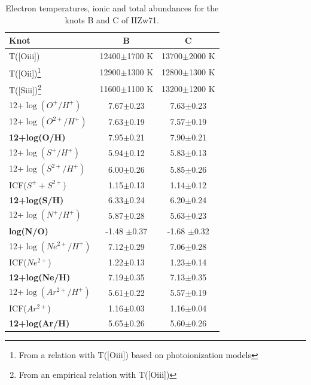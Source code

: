\documentclass[structabstract]{aa}
\begin{document}
\begin{table}
\begin{minipage}{85mm}
{\small
\caption{Electron temperatures, ionic and total abundances for
the knots B and C of IIZw71.} 
\begin{center}
\begin{tabular}{l cc }
\hline
\hline
Knot & B & C \\
                          
\hline                                    
T([O{\sc iii}])&  12400$\pm$1700 K & 13700$\pm$2000 K     \\ 
T([O{\sc ii}])\footnote{From a relation with T([O{\sc iii}]) based on photoionization models} &  12900$\pm$1300 K & 12800$\pm$1300 K       \\ 
T([S{\sc iii}])\footnote{From an empirical relation with T([O{\sc iii}])} &  11600$\pm$1100 K & 13200$\pm$1200 K     \\ 
\hline
12+$\log(O^+/H^+)$    &7.67$\pm$0.23 & 7.63$\pm$0.23   \\
12+$\log(O^{2+}/H^+)$ & 7.63$\pm$0.19 & 7.57$\pm$0.19  \\
\bf{ 12+log(O/H)}     & 7.95$\pm$0.21 & 7.90$\pm$0.21 \\
\hline                                                                  
12+$\log(S^+/H^+)$    & 5.94$\pm$0.12 & 5.83$\pm$0.13  \\
12+$\log(S^{2+}/H^+)$ & 6.00$\pm$0.26 &  5.85$\pm$0.26  \\
ICF($S^++S^{2+}$)     & 1.15$\pm$0.13 & 1.14$\pm$0.12 \\
\bf{ 12+log(S/H)}     & 6.33$\pm$0.24 & 6.20$\pm$0.24   \\
\hline                                                                  
12+$\log(N^+/H^+)$    & 5.87$\pm$0.28 & 5.63$\pm$0.23   \\
\bf{log(N/O)}         & -1.48 $\pm$0.37 & -1.68 $\pm$0.32   \\
\hline                                                                  
12+$\log(Ne^{2+}/H^+)$& 7.12$\pm$0.29 & 7.06$\pm$0.28   \\
ICF($Ne^{2+}$)& 1.22$\pm$0.13 & 1.23$\pm$0.14   \\
\bf{ 12+log(Ne/H)}    & 7.19$\pm$0.35 &  7.13$\pm$0.35   \\
\hline                                                                  
12+$\log(Ar^{2+}/H^+)$& 5.61$\pm$0.22 &  5.57$\pm$0.19  \\
ICF($Ar^{2+}$)& 1.16$\pm$0.03 & 1.16$\pm$0.04   \\
\bf{ 12+log(Ar/H)}    & 5.65$\pm$0.26 &  5.60$\pm$0.26   \\
\hline                                                        
\hline

\end{tabular}
\label{ionic}
\end{center}}
\end{minipage}
\end{table}
\end{document}
